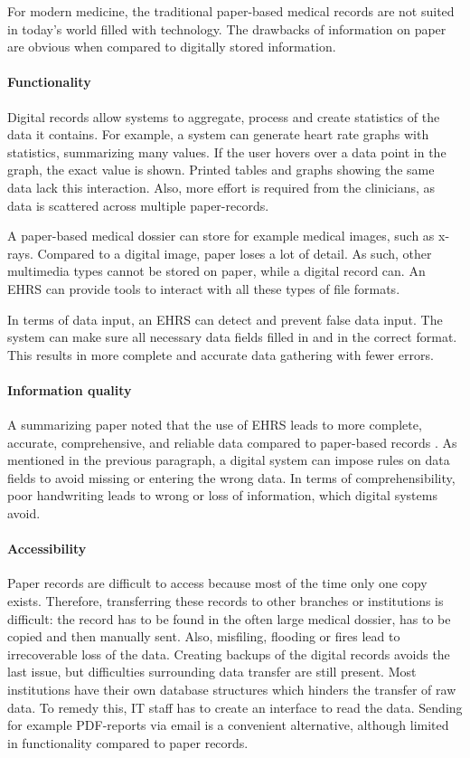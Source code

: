         For modern medicine, the traditional paper-based medical records are not suited in today's world filled with technology. The drawbacks of information on paper are obvious when compared to digitally stored information.

        \paragraph{Functionality} Digital records allow systems to aggregate, process and create statistics of the data it contains. For example, a system can generate heart rate graphs with statistics, summarizing many values. If the user hovers over a data point in the graph, the exact value is shown. Printed tables and graphs showing the same data lack this interaction. Also, more effort is required from the clinicians, as data is scattered across multiple paper-records.

        A paper-based medical dossier can store for example medical images, such as x-rays. Compared to a digital image, paper loses a lot of detail. As such, other multimedia types cannot be stored on paper, while a digital record can. An EHRS can provide tools to interact with all these types of file formats.

        In terms of data input, an EHRS can detect and prevent false data input. The system can make sure all necessary data fields filled in and in the correct format. This results in more complete and accurate data gathering with fewer errors.

        \paragraph{Information quality} A summarizing paper noted that the use of EHRS leads to more complete, accurate, comprehensive, and reliable data compared to paper-based records \cite{ehrs_summary}. As mentioned in the previous paragraph, a digital system can impose rules on data fields to avoid missing or entering the wrong data. In terms of comprehensibility, poor handwriting leads to wrong or loss of information, which digital systems avoid.

        \paragraph{Accessibility} Paper records are difficult to access because most of the time only one copy exists. Therefore, transferring these records to other branches or institutions is difficult: the record has to be found in the often large medical dossier, has to be copied and then manually sent. Also, misfiling, flooding or fires lead to irrecoverable loss of the data. Creating backups of the digital records avoids the last issue, but difficulties surrounding data transfer are still present. Most institutions have their own database structures which hinders the transfer of raw data. To remedy this, IT staff has to create an interface to read the data. Sending for example PDF-reports via email is a convenient alternative, although limited in functionality compared to paper records.

